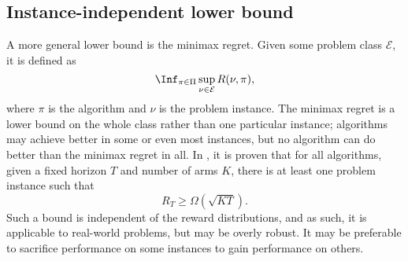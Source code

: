 \subsection{Instance-independent lower bound}
A more general lower bound is the minimax regret.
Given some problem class $\mathcal{E}$, it is defined as
\begin{equation}
    \Inf_{\pi \in \Pi} \sup_{\nu \in \mathcal{E}} R(\nu, \pi),
\end{equation}
where $\pi$ is the algorithm and $\nu$ is the problem instance.
The minimax regret is a lower bound on the whole class rather than one particular instance; algorithms may achieve better in some or even most instances, but no algorithm can do better than the minimax regret in all.
In \cite{lattimore2020}, it is proven that for all algorithms, given a fixed horizon $T$ and number of arms $K$, there is at least one problem instance such that
\begin{equation}
    R_T \geq \Omega(\sqrt{KT}).
\end{equation}
Such a bound is independent of the reward distributions, and as such, it is applicable to real-world problems, but may be overly robust.
It may be preferable to sacrifice performance on some instances to gain performance on others.